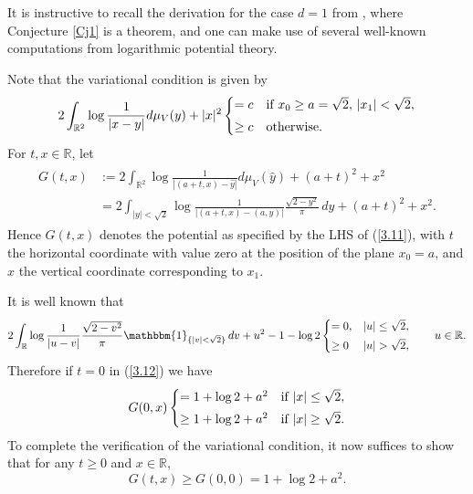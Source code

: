 \documentclass[10pt]{amsart}
\def\R{\mathbb{R}}
\theoremstyle{plain}
\theoremstyle{remark}
\numberwithin{equation}{section}
\begin{document}
It is instructive to recall the derivation for the case \( d = 1 \) from \cite{ASZ14}, where Conjecture \ref{Cj1} is a theorem, and one can make use of several well-known computations from logarithmic potential theory. 

Note that the variational condition is given by
\begin{equation}\label{3.11}
2 \int_{\R^2} \log\frac{1}{|x-y|} d\mu_V(y) + |x|^2  \begin{cases}
= c & \textup{if } x_0 \ge a = \sqrt{2},\,|x_1|<\sqrt{2},
\smallskip
\\
\ge c & \textup{otherwise}. 
\end{cases} 
\end{equation} 
For $t, x \in \R$, let 
\begin{align}\label{3.12}
\begin{split}
G(t,x)&:= 2 \int_{\R^2} \log\frac{1}{|(a+t,x)-\widehat{y}|} d\mu_V(\hat{y}) +(a+t)^2+ x^2 
\\
&=  2 \int_{ |y|<\sqrt{2} } \log \frac{1}{ |(a+t,x)-(a,y)| } \frac{ \sqrt{2-y^2} }{\pi}\,dy  +(a+t)^2+ x^2.
\end{split}
\end{align}
Hence $G(t,x)$ denotes the potential as specified by the LHS of (\ref{3.11}), with $t$ the horizontal coordinate with value zero at the position of the plane $x_0=a$, and $x$ the vertical coordinate
corresponding to $x_1$.

 
It is well known that \cite{ST97}
\begin{align} \label{EL condition for semi circle}
2 \int_\R \log \frac{1}{|u-v|} \frac{ \sqrt{2-v^2} }{ \pi } \mathbbm{1}_{ \{ |v| < \sqrt{2} \}  } \,dv   +u^2-1- \log 2  \begin{cases}
= 0, & |u| \le \sqrt{2},
\smallskip
\\
\ge 0 & |u| > \sqrt{2}, 
\end{cases}\qquad u \in \R.
\end{align}
Therefore if $t=0$ in (\ref{3.12}) we have
\begin{align*}
G(0,x) \begin{cases}
= 1+\log 2 +a^2 &\textup{if } |x| \le \sqrt{2},
\smallskip 
\\
\ge 1+\log 2 +a^2 &\textup{if } |x| \ge \sqrt{2}. 
\end{cases}
\end{align*} 
To complete the verification of the variational condition,
it now suffices to show that for any $t \ge 0$ and $x \in \R$, 
\begin{equation}\label{3.14}
G(t,x) \ge G(0,0)= 1+\log 2 +a^2. 
\end{equation}
\end{document}
